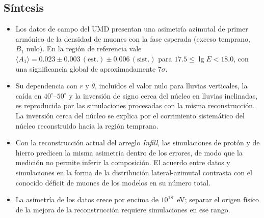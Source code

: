 \subsection{Síntesis}
\label{subsec:sintesis_datos}

\begin{itemize}
	\item Los datos de campo del UMD presentan una asimetría azimutal de primer armónico de la densidad de muones con la fase esperada (exceso temprano, $B_1$ nulo). En la región de referencia vale $\langle A_1 \rangle = 0.023 \pm 0.003\,(\mathrm{est.}) \pm 0.006\,(\mathrm{sist.})$ para $17.5 \leq \lg E < 18.0$, con una significancia global de aproximadamente $7\sigma$.
	\item Su dependencia con $r$ y $\theta$, incluidos el valor nulo para lluvias verticales, la caída en $40^\circ$--$50^\circ$ y la inversión de signo cerca del núcleo en lluvias inclinadas, es reproducida por las simulaciones procesadas con la misma reconstrucción. La inversión cerca del núcleo se explica por el corrimiento sistemático del núcleo reconstruido hacia la región temprana.
	\item Con la reconstrucción actual del arreglo \textit{Infill}, las simulaciones de protón y de hierro predicen la misma asimetría dentro de los errores, de modo que la medición no permite inferir la composición. El acuerdo entre datos y simulaciones en la forma de la distribución lateral-azimutal contrasta con el conocido déficit de muones de los modelos en su número total.
	\item La asimetría de los datos crece por encima de $10^{18}$~eV; separar el origen físico de la mejora de la reconstrucción requiere simulaciones en ese rango.
\end{itemize}

\newpage
